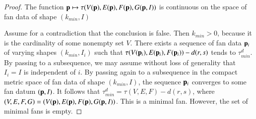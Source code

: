 \begin{proof} 
The function ${\mathbf p}\mapsto \tau(V({\mathbf p}),E({\mathbf p}),F({\mathbf p}),G({\mathbf p},I))$ is continuous on the space of fan data of shape $(k_{min},I)$

Assume for a contradiction that the conclusion is false.
Then $k_{min}>0$, because it is the cardinality of some nonempty set $V$.
There exists a sequence of fan data ${\mathbf p}_i$ of varying shapes $(k_{min},I_i)$ such that 
$\tau(V({\mathbf p}_i),E({\mathbf p}_i),F({\mathbf p}_i))-d(r,s)$ tends to $\tau^d_{min}$.  By passing to a subsequence, we may assume without loss of generality that $I_i = I$ is independent of $i$.
By passing again to a subsequence in the compact 
metric space of fan data of shape $(k_{min},I)$, the sequence ${\mathbf p}_i$ converges to some fan datum $({\mathbf p},I)$.
It follows that $\tau^d_{min} = \tau(V,E,F)-d(r,s)$, where $(V,E,F,G)=(V({\mathbf p}),E({\mathbf p}),F({\mathbf p}),G({\mathbf p},I))$.   
This is a minimal fan.
However, the set of minimal fans is empty.
\end{proof}


